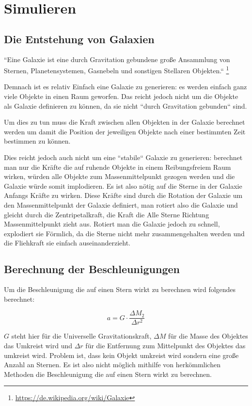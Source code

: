 \section{Simulieren}

\subsection{Die Entstehung von Galaxien}
``Eine Galaxie ist eine durch Gravitation gebundene große Ansammlung von
Sternen, Planetensystemen, Gasnebeln und sonstigen Stellaren Objekten.``
\footnote{\url{https://de.wikipedia.org/wiki/Galaxie}}

Demnach ist es relativ Einfach eine Galaxie zu generieren: es werden einfach
ganz viele Objekte in einen Raum geworfen. Das reicht jedoch nicht um die
Objekte als Galaxie definieren zu können, da sie nicht ``durch Gravitation
gebunden`` sind.

Um dies zu tun muss die Kraft zwischen allen Objekten in der Galaxie berechnet
werden um damit die Position der jeweiligen Objekte nach einer bestimmten Zeit
bestimmen zu können.

Dies reicht jedoch auch nicht um eine ``stabile`` Galaxie zu generieren:
berechnet man nur die Kräfte die auf ruhende Objekte in einem Reibungsfreiem Raum
wirken, würden alle Objekte zum Massenmittelpunkt gezogen werden und die Galaxie
würde somit implodieren. Es ist also nötig auf die Sterne in der Galaxie
Anfangs Kräfte zu wirken.  Diese Kräfte sind durch die Rotation der Galaxie um
den Massenmittelpunkt der Galaxie definiert, man rotiert also die Galaxie und
gleicht durch die Zentripetalkraft, die Kraft die Alle Sterne Richtung
Massenmittelpunkt zieht aus. Rotiert man die Galaxie jedoch zu schnell,
explodiert sie Förmlich, da die Sterne nicht mehr zusammengehalten werden und
die Fliehkraft sie einfach auseinanderzieht.

\subsection{Berechnung der Beschleunigungen}
Um die Beschleunigung die auf einen Stern wirkt zu berechnen wird folgendes
berechnet:

\begin{equation} \label{eq:beschleunigung}
    a = G \cdot \frac{\Delta{M_2}}{\Delta{r}^2}
\end{equation}

\( G \) steht hier für die Universelle Gravitationskraft, \( \Delta M \) für die
Masse des Objektes das Umkreist wird und \( \Delta r \) für die Entfernung zum
Mittelpunkt des Objektes das umkreist wird.
Problem ist, dass kein Objekt umkreist wird sondern eine große Anzahl an Sternen.
Es ist also nicht möglich mithilfe von herkömmlichen Methoden die Beschleunigung
die auf einen Stern wirkt zu berechnen.

